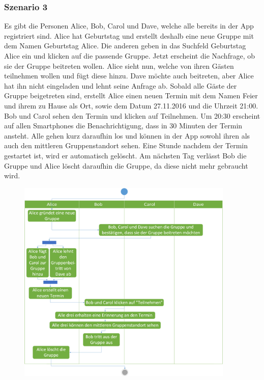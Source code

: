\documentclass{scrartcl}
\begin{document}
	\subsubsection{Szenario 3}
	Es gibt die Personen Alice, Bob, Carol und Dave, welche alle bereits in der App registriert sind.
	Alice hat Geburtstag und erstellt deshalb eine neue Gruppe mit dem Namen \glqq{}Geburtstag Alice\grqq{}. Die anderen geben in das Suchfeld \glqq{}Geburtstag Alice\grqq{} ein und klicken auf die passende Gruppe.
	Jetzt erscheint die Nachfrage, ob sie der Gruppe beitreten wollen. Alice sieht nun, welche von ihren Gästen teilnehmen wollen und fügt diese hinzu. Dave möchte auch beitreten, aber Alice hat ihn nicht eingeladen und lehnt seine Anfrage ab.
	Sobald alle Gäste der Gruppe beigetreten sind, erstellt Alice einen neuen Termin mit dem Namen \glqq{}Feier\grqq{} und ihrem zu Hause als Ort, sowie dem Datum \glqq{}27.11.2016\grqq{} und die Uhrzeit \glqq{}21:00\grqq{}.
	Bob und Carol sehen den Termin und klicken auf \glqq{}Teilnehmen\grqq{}.
	Um 20:30 erscheint auf allen Smartphones die Benachrichtigung, dass in 30 Minuten der Termin ansteht. Alle gehen kurz daraufhin los und können in der App sowohl ihren als auch den mittleren Gruppenstandort sehen.
	Eine Stunde nachdem der Termin gestartet ist, wird er automatisch gelöscht.
	Am nächsten Tag verlässt Bob die Gruppe und Alice löscht daraufhin die Gruppe, da diese nicht mehr gebraucht wird.	
	\begin{figure}[h]
		\centering
		\includegraphics[width=0.92\textwidth]{Szenario3}
	\end{figure}
	\newpage
	
\end{document}
